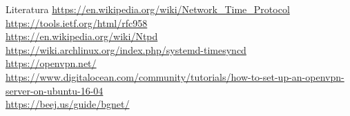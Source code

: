 \documentclass[t]{beamer}
\begin{document}
\begin{frame}{Literatura}
\url{https://en.wikipedia.org/wiki/Network_Time_Protocol}\\
\url{https://tools.ietf.org/html/rfc958}\\
\url{https://en.wikipedia.org/wiki/Ntpd}\\
\url{https://wiki.archlinux.org/index.php/systemd-timesyncd}\\
\url{https://openvpn.net/}\\
\url{https://www.digitalocean.com/community/tutorials/how-to-set-up-an-openvpn-server-on-ubuntu-16-04}\\
\url{https://beej.us/guide/bgnet/}\\
\end{frame}
\end{document}
